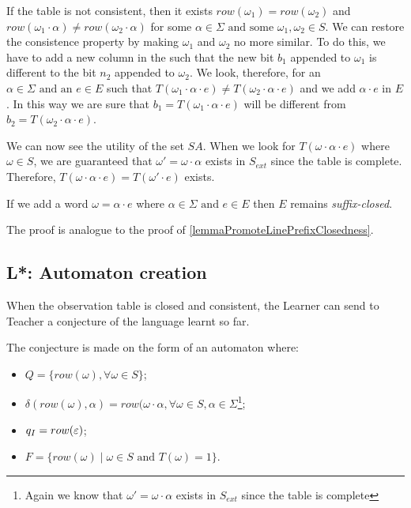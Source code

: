 If the table is not consistent, then it exists $row(\omega_1) = row(\omega_2)$ and $row(\omega_1 \cdot \alpha) \neq row(\omega_2 \cdot \alpha)$ for some $\alpha \in \Sigma \text{ and some }\omega_1, \omega_2 \in S$. We can restore the consistence property by making $\omega_1$ and $\omega_2$ no more similar. To do this, we have to add a new column in the \OT such that the new bit $b_1$ appended to $\omega_1$ is different to the bit $n_2$ appended to $\omega_2$. We look, therefore, for an $\alpha \in \Sigma \text{ and an } e \in E$ such that $T(\omega_1 \cdot \alpha \cdot e) \neq T(\omega_2 \cdot \alpha \cdot e)$ and we add $\alpha \cdot e$ in $E$. In this way we are sure that $b_1 = T(\omega_1 \cdot \alpha \cdot e)$ will be different from $b_2 = T(\omega_2 \cdot \alpha \cdot e)$.

We can now see the utility of the set $SA$. When we look for $T(\omega \cdot \alpha \cdot e)$ where $\omega \in S$, we are guaranteed that $\omega' = \omega \cdot \alpha$ exists in $S_{ext}$ since the table is complete. Therefore, $T(\omega \cdot \alpha \cdot e) = T(\omega' \cdot e)$ exists.

\begin{lemma}
  If we add a word $\omega = \alpha \cdot e$ where $\alpha \in \Sigma \text{ and } e \in E$ then $E$ remains \textit{suffix-closed}.
\end{lemma}

The proof is analogue to the proof of \cref{lemmaPromoteLinePrefixClosedness}.

\subsection{L*: Automaton creation}

When the observation table is closed and consistent, the Learner can send to Teacher a conjecture of the language learnt so far.

The conjecture is made on the form of an automaton where:
\begin{itemize}
  \item $Q = \{row(\omega), \forall \omega \in S\}$;
  \item $\delta(row(\omega), \alpha) = row(\omega \cdot \alpha, \forall \omega \in S, \alpha \in \Sigma$\footnote{Again we know that $\omega' = \omega\cdot\alpha$ exists in $S_{ext}$ since the table is complete };
  \item $q_I = row(\varepsilon)$;
  \item $F = \{row(\omega) \mid \omega \in S \text{ and } T(\omega) = 1 \}$.
\end{itemize}

